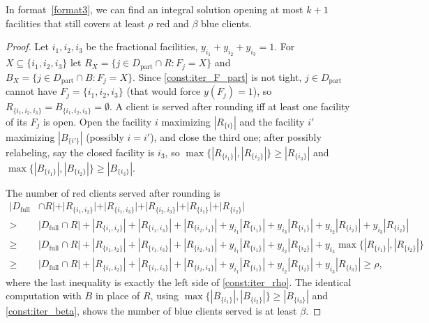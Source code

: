 \documentclass[a4paper,11pt]{article}
\begin{document}
\begin{lemma}
\label{lem:format3}
In format~\ref{format3}, we can find an integral solution opening at
most $k+1$ facilities that still covers at least $\rho$ red and $\beta$
blue clients.
\end{lemma}
\begin{proof}
Let $i_1,i_2,i_3$ be the fractional facilities, $y_{i_1}+y_{i_2}+y_{i_3}
=1$. For $X\subseteq\{i_1,i_2,i_3\}$ let $R_X = \{j\in D_\text{part}\cap
R : F_j=X\}$ and $B_X = \{j\in D_\text{part}\cap B : F_j=X\}$. Since
\eqref{const:iter_F_part} is not tight, $j\in D_\text{part}$ cannot have
$F_j=\{i_1,i_2,i_3\}$ (that would force $y(F_j)=1$), so
$R_{\{i_1,i_2,i_3\}}=B_{\{i_1,i_2,i_3\}}=\emptyset$. A client is served
after rounding iff at least one facility of its $F_j$ is open. Open the
facility $i$ maximizing $|R_{\{i\}}|$ and the facility $i'$ maximizing
$|B_{\{i'\}}|$ (possibly $i=i'$), and close the third one; after possibly
relabeling, say the closed facility is $i_3$, so $\max\{|R_{\{i_1\}}|,
|R_{\{i_2\}}|\}\ge|R_{\{i_3\}}|$ and $\max\{|B_{\{i_1\}}|,|B_{\{i_2\}}|\}
\ge|B_{\{i_3\}}|$.

The number of red clients served after rounding is
\begin{align*}
|D_\text{full} & \cap R| + |R_{\{i_1,i_2\}}| + |R_{\{i_1,i_3\}}| + |R_{\{i_2,i_3\}}| + |R_{\{i_1\}}| + |R_{\{i_2\}}|\\
> \ & |D_\text{full} \cap R| + |R_{\{i_1,i_2\}}| + |R_{\{i_1,i_3\}}| + |R_{\{i_2,i_3\}}| + y_{i_1} |R_{\{i_1\}}| + y_{i_3} |R_{\{i_1\}}| + y_{i_2}|R_{\{i_2\}}| + y_{i_3} |R_{\{i_2\}}| \\
\ge \ & |D_\text{full} \cap R| + |R_{\{i_1,i_2\}}| + |R_{\{i_1,i_3\}}| + |R_{\{i_2,i_3\}}| + y_{i_1} |R_{\{i_1\}}| + y_{i_2}|R_{\{i_2\}}| + y_{i_3} \max \{|R_{\{i_1\}}|,|R_{\{i_2\}}|\} \\
\ge \ & |D_\text{full} \cap R| + |R_{\{i_1,i_2\}}| + |R_{\{i_1,i_3\}}| + |R_{\{i_2,i_3\}}| + y_{i_1} |R_{\{i_1\}}| + y_{i_2}|R_{\{i_2\}}| + y_{i_3} |R_{\{i_3\}}| \ge \rho,
\end{align*}
where the last inequality is exactly the left side of
\eqref{const:iter_rho}. The identical computation with $B$ in place of
$R$, using $\max\{|B_{\{i_1\}}|,|B_{\{i_2\}}|\}\ge|B_{\{i_3\}}|$ and
\eqref{const:iter_beta}, shows the number of blue clients served is at
least $\beta$.
\end{proof}
\end{document}
